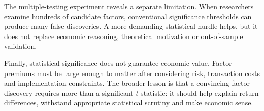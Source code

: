 The multiple-testing experiment reveals a separate limitation. When researchers examine hundreds of candidate factors, conventional significance thresholds can produce many false discoveries. A more demanding statistical hurdle helps, but it does not replace economic reasoning, theoretical motivation or out-of-sample validation.

Finally, statistical significance does not guarantee economic value. Factor premiums must be large enough to matter after considering risk, transaction costs and implementation constraints. The broader lesson is that a convincing factor discovery requires more than a significant $t$-statistic: it should help explain return differences, withstand appropriate statistical scrutiny and make economic sense.

